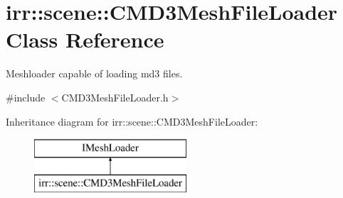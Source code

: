 \hypertarget{classirr_1_1scene_1_1_c_m_d3_mesh_file_loader}{\section{irr\-:\-:scene\-:\-:C\-M\-D3\-Mesh\-File\-Loader Class Reference}
\label{classirr_1_1scene_1_1_c_m_d3_mesh_file_loader}
}


Meshloader capable of loading md3 files.  




{\ttfamily \#include $<$C\-M\-D3\-Mesh\-File\-Loader.\-h$>$}

Inheritance diagram for irr\-:\-:scene\-:\-:C\-M\-D3\-Mesh\-File\-Loader\-:\begin{figure}[H]
\begin{center}
\leavevmode
\includegraphics[height=2.000000cm]{classirr_1_1scene_1_1_c_m_d3_mesh_file_loader}
\end{center}
\end{figure}
